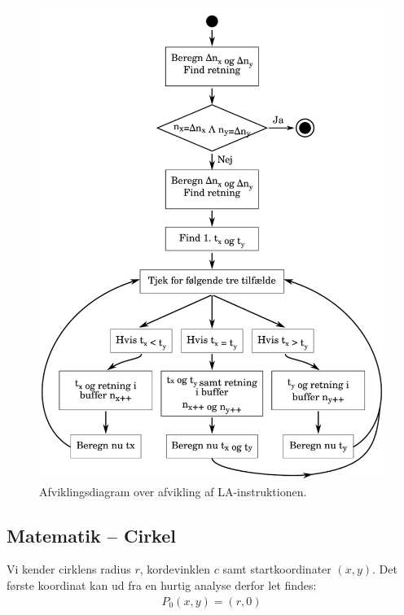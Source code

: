 \begin{figure}[htbp]
  \centering
  \includegraphics[width=.75\textwidth]{./img/la-behandling}
  \caption{Afviklingsdiagram over afvikling af LA-instruktionen.}
  \label{fig:la-behandling}
\end{figure}


\subsection{Matematik -- Cirkel}

Vi kender cirklens radius $r$, kordevinklen $c$ samt startkoordinater
$(x, y)$. Det første koordinat kan ud fra en hurtig analyse derfor let
findes:
\begin{align*}
P_0(x, y)=(r, 0)
\end{align*}


